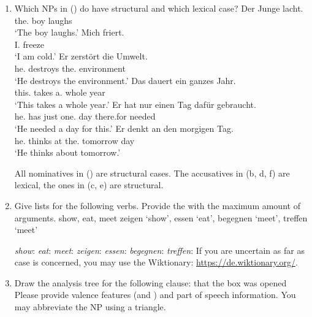 \begin{enumerate}
\item Which NPs in () do have structural and which lexical case?
\eal
\ex 
\gll Der        Junge lacht.\\
     the.\NOM{} boy   laughs\\
\glt `The boy laughs.'
\ex 
\gll Mich friert.\\
     I.\ACC{} freeze\\
\glt `I am cold.'
\ex 
\gll Er zerstört die Umwelt.\\
     he.\NOM{} destroys the.\ACC{} environment\\
\glt `He destroys the environment.'
\ex 
\gll Das dauert ein ganzes Jahr.\\
     this.\NOM{} takes  a.\ACC{} whole year\\
\glt `This takes a whole year.'
\ex 
\gll Er hat nur einen Tag dafür gebraucht.\\
     he.\NOM{} has just one.\ACC{}  day there.for needed\\
\glt `He needed a day for this.'
\ex 
\gll Er denkt an den morgigen Tag.\\
     he.\NOM{} thinks at the.\ACC{} tomorrow day\\
\glt `He thinks about tomorrow.'
\zl

All nominatives in () are structural cases. The accusatives in (b, d, f) are lexical,
the ones in (c, e) are structural.

\item Give \argst lists for the following verbs. Provide the \argstl with the maximum amount of arguments. 
\eal
\ex show, eat, meet \english
\ex zeigen `show', essen `eat', begegnen `meet', treffen `meet' \german
\zl

\eal
\ex \emph{show}: 
\ex \emph{eat}: 
\ex \emph{meet}: 
\zl
\eal
\ex \emph{zeigen}: 
\ex \emph{essen}: 
\ex \emph{begegnen}: 
\ex \emph{treffen}: 
\zl
If you are uncertain as far as case is concerned, you may use the
  Wiktionary: \url{https://de.wiktionary.org/}.

\item Draw the analysis tree for the following clause:
\ea
that the box was opened
\z
Please provide valence features (\spr and \comps) and part of speech information. You may abbreviate
the NP using a triangle.



\end{enumerate}
